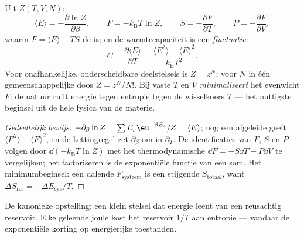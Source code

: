 \begin{proposition}[De machine]\label{prop:b3:canonical-ensemble:machine}
Uit $Z(T, V, N)$:
\[
\langle E\rangle = -\frac{\partial\ln Z}{\partial\beta} , \qquad
F = -k_{\text{B}}T\ln Z , \qquad
S = -\frac{\partial F}{\partial T} , \qquad
P = -\frac{\partial F}{\partial V} ,
\]
waarin $F = \langle E\rangle - TS$ de \emph{} is; en de
warmtecapaciteit is een \emph{fluctuatie}:
\[
C = \frac{\partial\langle E\rangle}{\partial T}
 = \frac{\langle E^2\rangle - \langle E\rangle^2}
{k_{\text{B}}T^2} .
\]
Voor onafhankelijke, onderscheidbare deelstelsels is $Z = z^N$; voor $N$
 in één gemeenschappelijke doos $Z = z^N/N!$. Bij vaste
$T$ en $V$ \emph{minimaliseert} het evenwicht $F$: de natuur ruilt energie
tegen entropie tegen de wisselkoers $T$ --- het nuttigste beginsel uit de
hele fysica van de materie.
\end{proposition}

\begin{proof}[Gedeeltelijk bewijs]
$-\partial_\beta\ln Z = \sum E_s\eu^{-\beta E_s}/Z = \langle
E\rangle$;
nog een afgeleide geeft $\langle E^2\rangle - \langle
E\rangle^2$, en de
kettingregel zet $\partial_\beta$ om in $\partial_T$. De identificaties van
$F$, $S$ en $P$ volgen door $\dd(-k_{\text{B}}T\ln Z)$ met het
thermodynamische $\dd F = -S\dd T - P\dd V$ te vergelijken; het
factoriseren is de exponentiële functie van een som. Het minimumbeginsel:
een dalende $F_{\text{systeem}}$ is een stijgende $S_{\text{totaal}}$, want
$\Delta S_{\text{res}} =
-\Delta E_{\text{sys}}/T$.
\end{proof}

\begin{omfigure}

{\small De kanonieke opstelling: een klein stelsel dat energie leent van
een reusachtig reservoir. Elke geleende joule kost het reservoir $1/T$ aan
entropie --- vandaar de exponentiële korting op energierijke toestanden.}
\end{omfigure}

